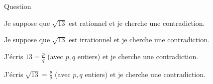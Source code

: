 \begin{multi}[multiple,feedback=
{Par l'absurde on suppose que \(\sqrt{13} \in \Qq\), c'est-à-dire que c'est un nombre rationnel, autrement dit qu'il s'écrit \(\frac{p}{q}\), avec \(p\), \(q\) entiers. Voir la preuve que \(\sqrt{2} \notin \Qq\).
}]{Question}
    \item* Je suppose que \(\sqrt{13}\) est rationnel et je cherche une contradiction.
    \item Je suppose que \(\sqrt{13}\) est irrationnel et je cherche une contradiction.
    \item J'écris \(13 = \frac{p}{q}\) (avec \(p,q\) entiers) et je cherche une contradiction.
    \item* J'écris \(\sqrt{13} = \frac{p}{q}\) (avec \(p,q\) entiers) et je cherche une contradiction.
\end{multi}
